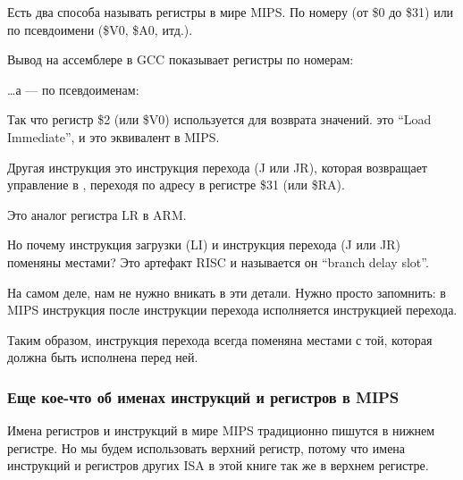 \label{MIPS_leaf_function_ex1}
Есть два способа называть регистры в мире MIPS. По номеру (от \$0 до \$31) или по псевдоимени (\$V0, \$A0, итд.).

Вывод на ассемблере в GCC показывает регистры по номерам:



\dots а \IDA --- по псевдоименам:



Так что регистр \$2 (или \$V0) используется для возврата значений.
 это ``Load Immediate'', и это эквивалент \MOV в MIPS.

Другая инструкция это инструкция перехода (J или JR), которая возвращает управление в , переходя по адресу в регистре \$31 (или \$RA).

Это аналог регистра \ac{LR} в ARM.

Но почему инструкция загрузки (LI) и инструкция перехода (J или JR) поменяны местами? Это артефакт \ac{RISC} и называется он ``branch delay slot''.

На самом деле, нам не нужно вникать в эти детали. Нужно просто запомнить: в MIPS инструкция после инструкции перехода исполняется  инструкцией перехода.

Таким образом, инструкция перехода всегда поменяна местами с той, которая должна быть исполнена перед ней.

\subsubsection{Еще кое-что об именах инструкций и регистров в MIPS}

Имена регистров и инструкций в мире MIPS традиционно пишутся в нижнем регистре.
Но мы будем использовать верхний регистр, потому что имена инструкций и регистров других \ac{ISA} в этой книге так же в верхнем регистре.

